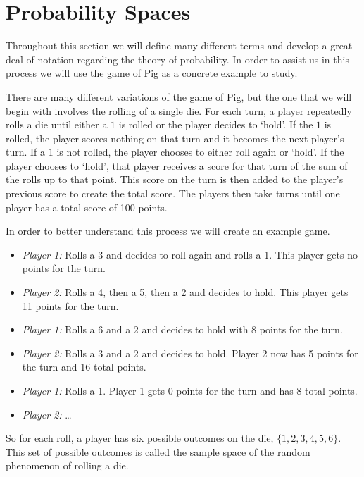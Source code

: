 \documentclass[
]{book}
\providecommand{\tightlist}{%
  \setlength{\itemsep}{0pt}\setlength{\parskip}{0pt}}
\let\stdsection\section
\renewcommand\section{\newpage\stdsection}
\theoremstyle{definition}
\theoremstyle{definition}
\theoremstyle{definition}
\theoremstyle{definition}
\theoremstyle{remark}
\begin{document}
\hypertarget{probability-spaces}{%
\section{Probability Spaces}\label{probability-spaces}}

Throughout this section we will define many different terms and develop a great deal of notation regarding the theory of probability. In order to assist us in this process we will use the game of Pig as a concrete example to study.

There are many different variations of the game of Pig, but the one that we will begin with involves the rolling of a single die. For each turn, a player repeatedly rolls a die until either a \(1\) is rolled or the player decides to `hold'. If the \(1\) is rolled, the player scores nothing on that turn and it becomes the next player's turn. If a \(1\) is not rolled, the player chooses to either roll again or `hold'. If the player chooses to `hold', that player receives a score for that turn of the sum of the rolls up to that point. This score on the turn is then added to the player's previous score to create the total score. The players then take turns until one player has a total score of 100 points.

In order to better understand this process we will create an example game.

\begin{itemize}
\tightlist
\item
  \emph{Player 1:} Rolls a 3 and decides to roll again and rolls a 1. This player gets no points for the turn.
\item
  \emph{Player 2:} Rolls a 4, then a 5, then a 2 and decides to hold. This player gets 11 points for the turn.
\item
  \emph{Player 1:} Rolls a 6 and a 2 and decides to hold with 8 points for the turn.
\item
  \emph{Player 2:} Rolls a 3 and a 2 and decides to hold. Player 2 now has 5 points for the turn and 16 total points.
\item
  \emph{Player 1:} Rolls a 1. Player 1 gets 0 points for the turn and has 8 total points.
\item
  \emph{Player 2:} \ldots{}
\end{itemize}

So for each roll, a player has six possible outcomes on the die, \(\{1,2,3,4,5,6\}\). This set of possible outcomes is called the sample space of the random phenomenon of rolling a die.
\end{document}
